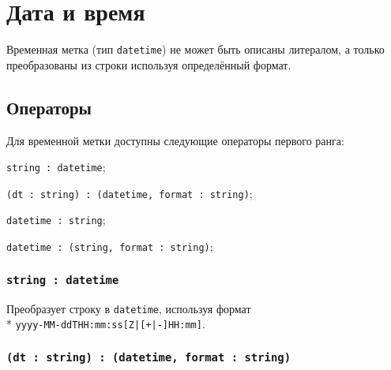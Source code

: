 \section{Дата и время}

Временная метка (тип \texttt{datetime}) не может быть описаны литералом, а только преобразованы из строки используя определённый формат.

\subsection{Операторы}

Для временной метки доступны следующие операторы первого ранга:
\begin{icItems}
	\item \texttt{string : datetime};
	\item \texttt{(dt : string) : (datetime, format : string)};
	\item \texttt{datetime : string};
	\item \texttt{datetime : (string, format : string)};
\end{icItems}

\subsubsection{\texttt{string : datetime}}

Преобразует строку в \texttt{datetime}, используя формат \\* \texttt{yyyy-MM-ddTHH:mm:ss[Z|[+|-]HH:mm]}.

\subsubsection{\texttt{(dt : string) : (datetime, format : string)}}

